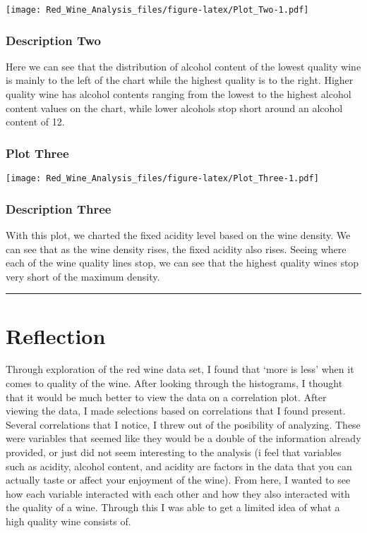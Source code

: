 \documentclass[]{article}
\begin{document}
\texttt{[image: Red\_Wine\_Analysis\_files/figure-latex/Plot\_Two-1.pdf]}

\hypertarget{description-two}{%
\subsubsection{Description Two}\label{description-two}}

Here we can see that the distribution of alcohol content of the lowest
quality wine is mainly to the left of the chart while the highest
quality is to the right. Higher quality wine has alcohol contents
ranging from the lowest to the highest alcohol content values on the
chart, while lower alcohols stop short around an alcohol content of 12.

\hypertarget{plot-three}{%
\subsubsection{Plot Three}\label{plot-three}}

\texttt{[image: Red\_Wine\_Analysis\_files/figure-latex/Plot\_Three-1.pdf]}

\hypertarget{description-three}{%
\subsubsection{Description Three}\label{description-three}}

With this plot, we charted the fixed acidity level based on the wine
density. We can see that as the wine density rises, the fixed acidity
also rises. Seeing where each of the wine quality lines stop, we can see
that the highest quality wines stop very short of the maximum density.

\begin{center}\rule{0.5\linewidth}{\linethickness}\end{center}

\hypertarget{reflection}{%
\section{Reflection}\label{reflection}}

Through exploration of the red wine data set, I found that `more is
less' when it comes to quality of the wine. After looking through the
histograms, I thought that it would be much better to view the data on a
correlation plot. After viewing the data, I made selections based on
correlations that I found present. Several correlations that I notice, I
threw out of the posibility of analyzing. These were variables that
seemed like they would be a double of the information already provided,
or just did not seem interesting to the analysis (i feel that variables
such as acidity, alcohol content, and acidity are factors in the data
that you can actually taste or affect your enjoyment of the wine). From
here, I wanted to see how each variable interacted with each other and
how they also interacted with the quality of a wine. Through this I was
able to get a limited idea of what a high quality wine consists of.
\end{document}
